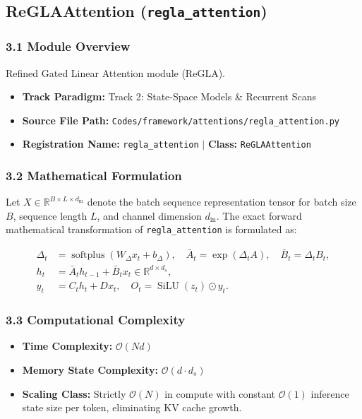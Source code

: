 \subsection{ReGLAAttention (\texttt{regla\_attention})}
\label{sec:app_module_regla_attention}

\subsubsection*{3.1 Module Overview}
Refined Gated Linear Attention module (ReGLA).
\begin{itemize}
    \item \textbf{Track Paradigm:} Track 2: State-Space Models \& Recurrent Scans
    \item \textbf{Source File Path:} \texttt{Codes/framework/attentions/regla\_attention.py}
    \item \textbf{Registration Name:} \texttt{regla\_attention} $\mid$ \textbf{Class:} \texttt{ReGLAAttention}
\end{itemize}

\subsubsection*{3.2 Mathematical Formulation}
Let $X \in \mathbb{R}^{B \times L \times d_{\text{in}}}$ denote the batch sequence representation tensor for batch size $B$, sequence length $L$, and channel dimension $d_{\text{in}}$. The exact forward mathematical transformation of \texttt{regla\_attention} is formulated as:

\begin{align}
\Delta_t &= \operatorname{softplus}(W_\Delta x_t + b_\Delta), \quad \bar{A}_t = \exp(\Delta_t A), \quad \bar{B}_t = \Delta_t B_t, \\
h_t &= \bar{A}_t h_{t-1} + \bar{B}_t x_t \in \mathbb{R}^{d \times d_s}, \\
y_t &= C_t h_t + D x_t, \quad O_t = \operatorname{SiLU}(z_t) \odot y_t.
\end{align}


\subsubsection*{3.3 Computational Complexity}
\begin{itemize}
    \item \textbf{Time Complexity:} $\mathcal{O}(N d)$
    \item \textbf{Memory State Complexity:} $\mathcal{O}(d \cdot d_s)$
    \item \textbf{Scaling Class:} Strictly $\mathcal{O}(N)$ in compute with constant $\mathcal{O}(1)$ inference state size per token, eliminating KV cache growth.
\end{itemize}

